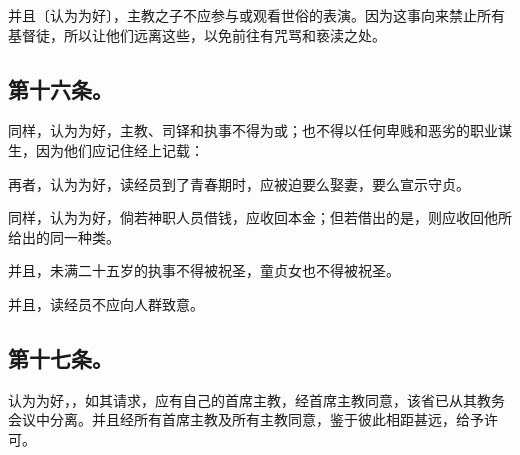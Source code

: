 并且〔认为为好〕，主教之子不应参与或观看世俗的表演。因为这事向来禁止所有基督徒，所以让他们远离这些，以免前往有咒骂和亵渎之处。\par


\subsection{第十六条。}

\par

同样，认为为好，主教、司铎和执事不得为或；也不得以任何卑贱和恶劣的职业谋生，因为他们应记住经上记载：\par

再者，认为为好，读经员到了青春期时，应被迫要么娶妻，要么宣示守贞。\par

同样，认为为好，倘若神职人员借钱，应收回本金；但若借出的是，则应收回他所给出的同一种类。\par

并且，未满二十五岁的执事不得被祝圣，童贞女也不得被祝圣。\par

并且，读经员不应向人群致意。\par


\subsection{第十七条。}

\par

认为为好，，如其请求，应有自己的首席主教，经首席主教同意，该省已从其教务会议中分离。并且经所有首席主教及所有主教同意，鉴于彼此相距甚远，给予许可。\par


